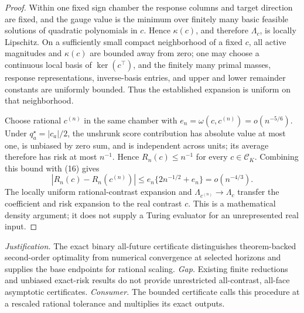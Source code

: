 \documentclass{article}
\begin{document}
\begin{proof}
Within one fixed sign chamber the response columns and target direction are fixed, and the gauge value is the minimum over finitely many basic feasible solutions of quadratic polynomials in \(c\).  Hence \(\kappa(c)\), and therefore \(\Lambda_c\), is locally Lipschitz.  On a sufficiently small compact neighborhood of a fixed \(c\), all active magnitudes and \(\kappa(c)\) are bounded away from zero; one may choose a continuous local basis of \(\ker(c^\top)\), and the finitely many primal masses, response representations, inverse-basis entries, and upper and lower remainder constants are uniformly bounded.  Thus the established expansion is uniform on that neighborhood.

Choose rational \(c^{(n)}\) in the same chamber with \(e_n=\omega(c,c^{(n)})=o(n^{-5/6})\).  Under \(q_a^\star=|c_a|/2\), the unshrunk score contribution has absolute value at most one, is unbiased by zero sum, and is independent across units; its average therefore has risk at most \(n^{-1}\).  Hence \(R_n(c)\le n^{-1}\) for every \(c\in\mathcal C_K\).  Combining this bound with (16) gives
\[
|R_n(c)-R_n(c^{(n)})|
\le e_n\{2n^{-1/2}+e_n\}
=o(n^{-4/3}).
\tag{17}
\]
The locally uniform rational-contrast expansion and \(\Lambda_{c^{(n)}}\to\Lambda_c\) transfer the coefficient and risk expansion to the real contrast \(c\).  This is a mathematical density argument; it does not supply a Turing evaluator for an unrepresented real input.
\end{proof}
\par\smallskip\noindent \textit{Justification.} The exact binary all-future certificate distinguishes theorem-backed second-order optimality from numerical convergence at selected horizons and supplies the base endpoints for rational scaling. \textit{Gap.} Existing finite reductions and unbiased exact-risk results do not provide unrestricted all-contrast, all-face asymptotic certificates. \textit{Consumer.} The bounded certificate calls this procedure at a rescaled rational tolerance and multiplies its exact outputs.
\end{document}
